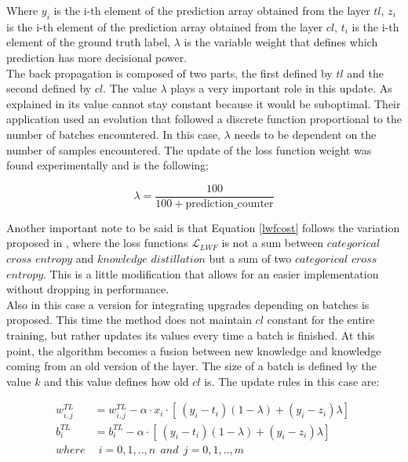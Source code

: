 \documentclass[12pt]{report}
\begin{document}
Where $y_i$ is the i-th element of the prediction array obtained from the layer $tl$, $z_i$ is the i-th element of the prediction array obtained from the layer $cl$, $t_i$ is the i-th element of the ground truth label, $\lambda$ is the variable weight that defines which prediction has more decisional power.\\
The back propagation is composed of two parts, the first defined by $tl$ and the second defined by $cl$. The value $\lambda$ plays a very important role in this update. As explained in \autocite{maltoni2019continuous} its value cannot stay constant because it would be suboptimal. Their application used an evolution that followed a discrete function proportional to the number of batches encountered. In this case, $\lambda$ needs to be dependent on the number of samples encountered. The update of the loss function weight was found experimentally and is the following:

\begin{equation}
	\lambda = \frac{100}{100+ \text{prediction$\_$counter}}
\end{equation}

Another important note to be said is that Equation \ref{lwfcost} follows the variation proposed in \autocite{maltoni2019continuous}, where the loss functions $\mathcal{L}_{LWF}$ is not a sum between $categorical$ $cross$ $entropy$ and $knowledge$ $distillation$ but a sum of two $categorical$ $cross$ $entropy$. This is a little modification that allows for an easier implementation without dropping in performance. \\
Also in this case a version for integrating upgrades depending on batches is proposed. This time the method does not maintain $cl$ constant for the entire training, but rather updates its values every time a batch is finished. At this point, the algorithm becomes a fusion between new knowledge and knowledge coming from an old version of the layer. The size of a batch is defined by the value $k$ and this value defines how old $cl$ is. The update rules in this case are:

\begin{align}
	w^{TL}_{i,j} &= w^{TL}_{i,j} - \alpha \cdot x_i \cdot [\ (y_i - t_i)(1-\lambda) + (y_i - z_i)\lambda ]\ \\
	b^{TL}_i     &= b^{TL}_i - \alpha \cdot [\ (y_i - t_i)(1-\lambda) + (y_i - z_i)\lambda ]\ \\
	where        & \: \: i= 0,1,..,n  \: \: and \: \:  j=0,1,..,m \nonumber  
\end{align} 
\end{document}
